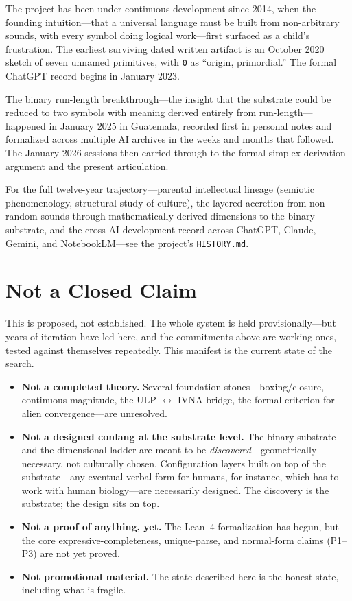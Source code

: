 \documentclass[12pt]{article}
\begin{document}
The project has been under continuous development since 2014, when the founding intuition---that a universal language must be built from non-arbitrary sounds, with every symbol doing logical work---first surfaced as a child's frustration. The earliest surviving dated written artifact is an October 2020 sketch of seven unnamed primitives, with \texttt{0} as ``origin, primordial.'' The formal ChatGPT record begins in January 2023.

The binary run-length breakthrough---the insight that the substrate could be reduced to two symbols with meaning derived entirely from run-length---happened in January 2025 in Guatemala, recorded first in personal notes and formalized across multiple AI archives in the weeks and months that followed. The January 2026 sessions then carried through to the formal simplex-derivation argument and the present articulation.

For the full twelve-year trajectory---parental intellectual lineage (semiotic phenomenology, structural study of culture), the layered accretion from non-random sounds through mathematically-derived dimensions to the binary substrate, and the cross-AI development record across ChatGPT, Claude, Gemini, and NotebookLM---see the project's \texttt{HISTORY.md}.

\section{Not a Closed Claim}
\label{sec:not}

This is proposed, not established. The whole system is held provisionally---but years of iteration have led here, and the commitments above are working ones, tested against themselves repeatedly. This manifest is the current state of the search.

\begin{itemize}[leftmargin=*, itemsep=0.3em]
    \item \textbf{Not a completed theory.} Several foundation-stones---boxing/closure, continuous magnitude, the ULP $\leftrightarrow$ IVNA bridge, the formal criterion for alien convergence---are unresolved.
    \item \textbf{Not a designed conlang at the substrate level.} The binary substrate and the dimensional ladder are meant to be \emph{discovered}---geometrically necessary, not culturally chosen. Configuration layers built on top of the substrate---any eventual verbal form for humans, for instance, which has to work with human biology---are necessarily designed. The discovery is the substrate; the design sits on top.
    \item \textbf{Not a proof of anything, yet.} The Lean~4 formalization has begun, but the core expressive-completeness, unique-parse, and normal-form claims (P1--P3) are not yet proved.
    \item \textbf{Not promotional material.} The state described here is the honest state, including what is fragile.
\end{itemize}
\end{document}
